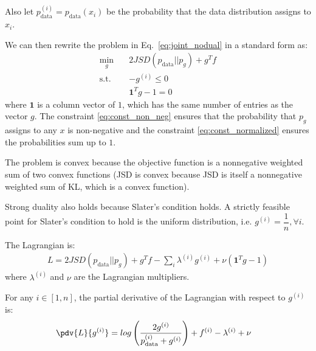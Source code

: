 Also let $ p_{\text{data} }^{(i)} = p_{\text{data} } (x_i) $ be the probability that the data distribution assigns to $x_i$.

We can then rewrite the problem in Eq.~\ref{eq:joint_nodual} in a standard form \cite{boyd2004convex} as:
\begin{align}
\min_{g} \quad & 2JSD( p_{\text{data}} || p_g )  + g^T f \\
\textrm{s.t.} \quad & - g^{(i)} \leq 0 \label{eq:const_non_neg} \\
  & \mathbf{1}^T g - 1 = 0 \label{eq:const_normalized}
\end{align}
where $\mathbf{1}$ is a column vector of $1$, which has the same number of entries as the vector $g$. The constraint \ref{eq:const_non_neg} ensures that the probability that $p_g$ assigns to any $x$ is non-negative and the constraint \ref{eq:const_normalized} ensures the probabilities sum up to $1$.

The problem is convex because the objective function is a nonnegative weighted sum of two convex functions (JSD is convex because JSD is itself a nonnegative weighted sum of KL, which is a convex function). 

Strong duality also holds because Slater's condition holds. A strictly feasible point for Slater's condition to hold is the uniform distribution, i.e. $g^{(i)} = \dfrac{1}{n}, \forall i$.

The Lagrangian is:
\begin{align}
    L = 2JSD( p_{\text{data}} || p_g )  + g^T f - \sum_i \lambda^{(i)} g^{(i)} + \nu ( \mathbf{1}^T g - 1 )
\end{align}
where $\lambda^{(i)}$ and $\nu$ are the Lagrangian multipliers.

For any $i \in [1, n]$, the partial derivative of the Lagrangian with respect to $g^{(i)}$ is:
\begin{align}
    \pdv{L}{ g^{(i)} } & = log \left( \dfrac{ 2g^{(i)} } { p_{\text{data} }^{(i)} + g^{(i)} } \right) + f^{ (i) } - \lambda^{(i)} + \nu
 \end{align}


